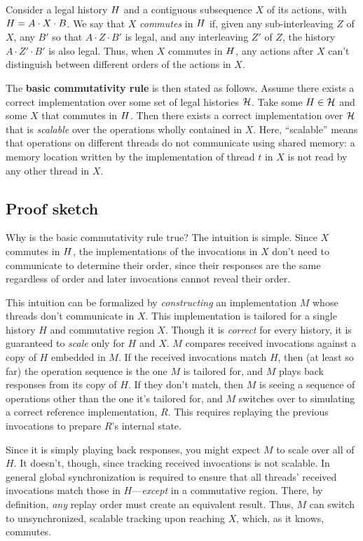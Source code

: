 Consider a legal history $H$ and a contiguous subsequence $X$ of its
actions, with $H = A \cdot X \cdot B$.
%
We say that $X$ \emph{commutes} in $H$ if, given any
sub-interleaving $Z$ of $X$, any $B'$ so that
$A \cdot Z \cdot B'$ is legal, and any interleaving $Z'$ of $Z$, the
history $A \cdot Z' \cdot B'$ is also legal.
%
Thus, when $X$ commutes in $H$, any actions after $X$ can't
distinguish between different orders of the actions in $X$.

The \textbf{basic commutativity rule} is then stated as follows.
%
Assume there exists a correct implementation over some set of legal
histories $\mathcal{H}$.
%
Take some $H \in \mathcal{H}$ and some $X$ that commutes in
$H$.
%
Then there exists a correct implementation over $\mathcal{H}$
that is \emph{scalable} over the operations wholly
contained in $X$.
%
Here, ``scalable'' means that operations on different threads do not
communicate using shared memory: a memory location written by the
implementation of thread $t$ in $X$ is not read by any other thread in
$X$.


\subsection{Proof sketch}

Why is the basic commutativity rule true?
%
The intuition is simple.
%
Since $X$ commutes in $H$, the implementations of the
invocations in $X$ don't need to communicate to determine their order,
since their responses are the same regardless of order and later
invocations cannot reveal their order.

This intuition can be formalized by \emph{constructing} an
implementation $M$
whose threads don't communicate in $X$.
%
This implementation is tailored for a single history $H$ and
commutative region $X$. Though it is \emph{correct} for every history, it is
guaranteed to \emph{scale} only for $H$ and $X$.
%
$M$ compares received invocations against a copy of $H$
embedded in $M$.
%
If the received invocations match $H$,
then (at least so far) the operation sequence is the one
$M$ is tailored for, and $M$
plays back responses from its copy of $H$.
%
If they don't match, then $M$ is seeing a
sequence of operations other than the one it's tailored for,
and $M$ switches over to
simulating a correct reference implementation, $R$.
%
This requires replaying the previous invocations to prepare $R$'s
internal state.

Since it is simply playing back responses, you might
expect $M$ to scale over all of $H$.
%
It doesn't, though, since tracking received invocations is not scalable.
%
In general global synchronization is required to ensure that all
threads' received invocations match those in $H$---\emph{except} in a
commutative region.
%
There, by definition, \emph{any} replay order must create an equivalent
result. Thus, $M$ can switch to unsynchronized, scalable tracking upon
reaching $X$, which, as it knows, commutes.

